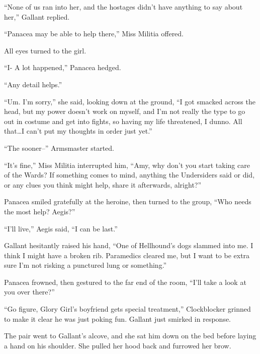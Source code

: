 ``None of us ran into her, and the hostages didn't have anything to say about her,'' Gallant replied.



``Panacea may be able to help there,'' Miss Militia offered.



All eyes turned to the girl.



``I- A lot happened,'' Panacea hedged.



``Any detail helps.''



``Um.  I'm sorry,'' she said, looking down at the ground, ``I got smacked across the head, but my power doesn't work on myself, and I'm not really the type to go out in costume and get into fights, so having my life threatened, I dunno.  All that\ldots I can't put my thoughts in order just yet.''



``The sooner--'' Armsmaster started.



``It's fine,'' Miss Militia interrupted him, ``Amy, why don't you start taking care of the Wards?  If something comes to mind, anything the Undersiders said or did, or any clues you think might help, share it afterwards, alright?''



Panacea smiled gratefully at the heroine, then turned to the group, ``Who needs the most help?  Aegis?''



``I'll live,'' Aegis said, ``I can be last.''



Gallant hesitantly raised his hand, ``One of Hellhound's dogs slammed into me.  I think I might have a broken rib.  Paramedics cleared me, but I want to be extra sure I'm not risking a punctured lung or something.''



Panacea frowned, then gestured to the far end of the room, ``I'll take a look at you over there?''



``Go figure, Glory Girl's boyfriend gets special treatment,'' Clockblocker grinned to make it clear he was just poking fun.  Gallant just smirked in response.



The pair went to Gallant's alcove, and she sat him down on the bed before laying a hand on his shoulder.  She pulled her hood back and furrowed her brow.



